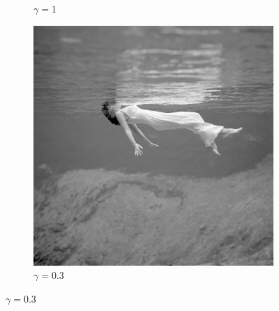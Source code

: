 \begin{figure}
\begin{subfigure}{.32\textwidth}
		\caption{$\gamma=1$}
	\end{subfigure}
	\begin{subfigure}{.32\textwidth}
		\centering
		\includegraphics[width=.99\linewidth]{A1/gamma=0.3.png}
		\caption{$\gamma=0.3$}
	\end{subfigure}
\end{figure}